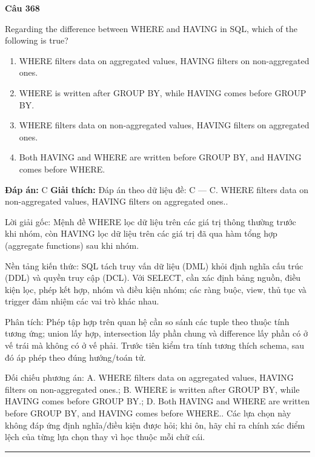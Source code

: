 \documentclass[11pt,a4paper]{article}
\newenvironment{question}[1]{%
  \par\vspace{1em}\noindent\textbf{\large Câu #1}\par\vspace{0.4em}
}{%
  \par\vspace{1em}\hrule\vspace{0.6em}
}
\newenvironment{choices}{%
  \begin{enumerate}[label=\textbf{\Alph*.},leftmargin=2.2em,itemsep=2pt,topsep=3pt]
}{%
  \end{enumerate}
}
\newcommand{\choice}{\item}
\begin{document}
\begin{question}{368}
Regarding the difference between WHERE and HAVING in SQL, which of the following is true?
\begin{choices}
\choice WHERE filters data on aggregated values, HAVING filters on non-aggregated ones.
\choice WHERE is written after GROUP BY, while HAVING comes before GROUP BY.
\choice WHERE filters data on non-aggregated values, HAVING filters on aggregated ones.
\choice Both HAVING and WHERE are written before GROUP BY, and HAVING comes before WHERE.
\end{choices}
\textbf{Đáp án:} C
\textbf{Giải thích:} Đáp án theo dữ liệu đề: C — C. WHERE filters data on non-aggregated values, HAVING filters on aggregated ones..

Lời giải gốc: Mệnh đề WHERE lọc dữ liệu trên các giá trị thông thường trước khi nhóm, còn HAVING lọc dữ liệu trên các giá trị đã qua hàm tổng hợp (aggregate functions) sau khi nhóm.

Nền tảng kiến thức: SQL tách truy vấn dữ liệu (DML) khỏi định nghĩa cấu trúc (DDL) và quyền truy cập (DCL). Với SELECT, cần xác định bảng nguồn, điều kiện lọc, phép kết hợp, nhóm và điều kiện nhóm; các ràng buộc, view, thủ tục và trigger đảm nhiệm các vai trò khác nhau.

Phân tích: Phép tập hợp trên quan hệ cần so sánh các tuple theo thuộc tính tương ứng; union lấy hợp, intersection lấy phần chung và difference lấy phần có ở vế trái mà không có ở vế phải. Trước tiên kiểm tra tính tương thích schema, sau đó áp phép theo đúng hướng/toán tử.

Đối chiếu phương án: A. WHERE filters data on aggregated values, HAVING filters on non-aggregated ones.; B. WHERE is written after GROUP BY, while HAVING comes before GROUP BY.; D. Both HAVING and WHERE are written before GROUP BY, and HAVING comes before WHERE.. Các lựa chọn này không đáp ứng định nghĩa/điều kiện được hỏi; khi ôn, hãy chỉ ra chính xác điểm lệch của từng lựa chọn thay vì học thuộc mỗi chữ cái.
\end{question}
\end{document}

